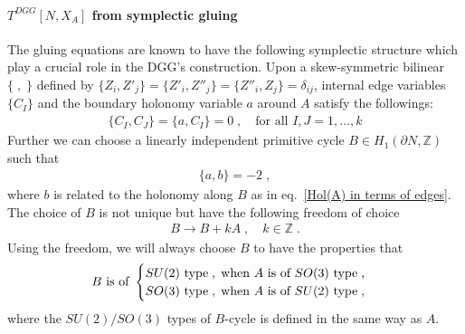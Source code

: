 \documentclass[a4paper,11pt]{article}
\begin{document}
\paragraph{$T^{DGG}[N,X_A]$ from symplectic gluing} The gluing equations are known to have the following symplectic structure \cite{neumann1985volumes,neumann1992combinatorics} which play a crucial role in the DGG's construction. Upon a skew-symmetric bilinear $\{ \;, \;\}$ \textrm{defined by } $\{Z_i, Z'_j  \} =\{Z'_i, Z''_j  \} = \{ Z''_i, Z_j \} = \delta_{ij}$, internal edge variables $\{C_I\}$ and the boundary holonomy variable $a$ around $A$ satisfy the followings:  
%
\begin{align}
\{ C_I, C_J\} = \{ a , C_I\} =0\;, \quad \textrm{for all $I,J=1,\ldots, k$}
\end{align}
%
Further we can choose a linearly independent primitive cycle $B\in H_1 (\partial N, \mathbb{Z})$ such that %
%
\begin{align}
\{a, b\} =- 2\;, 
\end{align}
%
where $b$ is related to the holonomy along $B$ as in eq.~\eqref{Hol(A) in terms of edges}. The choice of $B$ is not unique but have the following freedom of choice
%
\begin{align}
B\rightarrow B+ k A\;, \quad k \in \mathbb{Z}\;.
\end{align}
%
Using the freedom, we will always choose $B$ to have the properties that
%
\begin{align}
B \textrm{ is of }
 \begin{cases}
 \textrm{$SU(2)$ type}\;,\;\textrm{when $A$ is of  $SO(3)$ type\;,}
 \\
\textrm{$SO(3)$ type}\;,\;\textrm{when $A$ is of $SU(2)$ type\;,} \label{types of (A,B)}
\end{cases}
\end{align}
%
where the $SU(2)/SO(3)$ types of $B$-cycle is defined in the same way as $A$.
\end{document}
